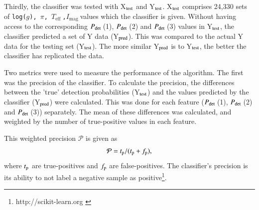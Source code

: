 \documentclass[a4paper,fleqn,usenatbib,useAMS]{mnras}
\newcommand{\teff}{\ensuremath{T_{\textrm{eff}}\:}}
\newcommand{\pdet}{\ensuremath{P_{\rm det}\:}}
\newcommand{\imag}{\ensuremath{I_{\textrm{mag}}\:}}
\begin{document}
Thirdly, the classifier was tested with X$_{\rm test}$ and Y$_{\rm test}$.  X$_{\rm test}$ comprises 24,330 sets of \texttt{log($g$), $\pi$, \teff,\:[M/H]\:\imag}values which the classifier is given. Without having access to the corresponding \pdet(1), \pdet(2) and \pdet(3) values in Y$_{\rm test}$, the classifier predicted a set of Y data (Y$_{\rm pred}$). This was compared to the actual Y data for the testing set (Y$_{\rm test}$). The more similar Y$_{\rm pred}$ is to Y$_{\rm test}$, the better the classifier has replicated the data.

Two metrics were used to measure the performance of the algorithm. The first was the precision of the classifier. To calculate the precision, the differences between the 'true' detection probabilities (Y$_{\rm test}$) and the values predicted by the classifier (Y$_{\rm pred}$) were calculated. This was done for each feature (\pdet(1), \pdet(2) and \pdet(3)) separately. The mean of these differences was calculated, and weighted by the number of true-positive values in each feature.

This weighted precision $\mathcal{P}$ is given as
\begin{equation}
\mathcal{P} = t_{\rm p} / (t_{\rm p} + f_{\rm p}), 
\end{equation}
where $t_{\rm p}$ are true-positives and $f_{\rm p}$ are false-positives. The classifier's precision is its ability to not label a negative sample as positive\footnote{http://scikit-learn.org \label{scikit}}.
\end{document}
